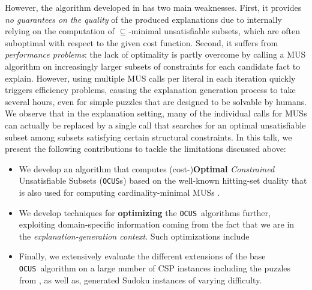 \documentclass[a4paper,UKenglish,cleveref, autoref, thm-restate, pdfa]{lipics-v2021}
\renewcommand\comment[1]{#1}
\newcommand{\bart}[1]{{\comment{\color{OliveGreen}Bart: #1}}}
\newcommand\comus{\texttt{OCUS}}
\begin{document}
However, the algorithm developed in \cite{ecai/BogaertsGCG20} has two main weaknesses.
First, it provides \emph{no guarantees on the quality} of the produced explanations due to internally relying on the computation of $\subseteq$-minimal unsatisfiable subsets, which are often suboptimal with respect to the given cost function. 
Second, it suffers from \emph{performance problems}: the lack of optimality is partly overcome by calling a MUS algorithm on increasingly larger subsets of constraints for each candidate fact to explain.
However, using multiple MUS calls per literal in each iteration quickly triggers efficiency problems, causing the explanation generation process to take several hours, even for simple puzzles that are designed to be solvable by humans.
We observe that in the explanation setting, many of the individual calls for MUSs can actually be replaced by a single call that searches for an optimal unsatisfiable subset among subsets satisfying certain structural constraints.
In this talk, we present the following contributions to tackle the limitations discussed above:
\begin{itemize}

	\item We develop an algorithm that computes (cost-)\textbf{Optimal} \emph{Constrained} Unsatisfiable Subsets (\comus{s}) based on the well-known hitting-set duality that is also used for computing cardinality-minimal MUSs \cite{ignatiev2015smallest,DBLP:conf/kr/SaikkoWJ16}.

	\item We develop techniques for \textbf{optimizing} the \comus~algorithms further, exploiting domain-specific information coming from the fact that we are in the \emph{explanation-generation context}. Such optimizations include 
\item Finally, we extensively evaluate the different extensions of the base \comus~algorithm on a large number of CSP instances including the puzzles from \cite{ecai/BogaertsGCG20,hoffmann2019explainable}, as well as, generated Sudoku instances of varying difficulty.
\end{itemize}
\end{document}
